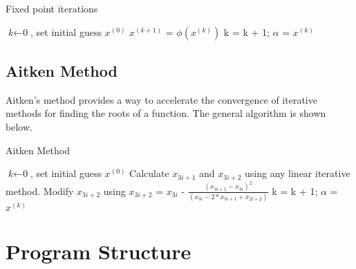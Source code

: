 \documentclass[11pt, a4paper]{article}
\begin{document}
\begin{algorithm}
  \caption{Fixed point iterations}\label{fixedpoint}
  \begin{algorithmic}[1]
    \State  $\textit{k} \gets \text{0}$, set initial guess $x^{(0)}$  
    \State $x^{(k+1)}$ = $\phi(x^{(k)})$
    \State k = k + 1;
    \EndWhile
    \Return $\alpha$ = $x^{(k)}$
  \end{algorithmic}
\end{algorithm}

\subsection{Aitken Method}
Aitken’s method provides a way to accelerate the convergence of iterative methods for finding the roots of a function.  The general algorithm is shown below.

\begin{algorithm}
  \caption{Aitken Method}\label{fixedpoint}
  \begin{algorithmic}[1]
    \State  $\textit{k} \gets \text{0}$, set initial guess $x^{(0)}$  
    \State Calculate $x_{3i+1}$ and $x_{3i+2}$ using any linear iterative method.
    \State Modify $x_{3i+2}$ using $x_{3i+2}$ = $x_{3i}$ - $\frac{(x_{3i+1}-x_{3i})^{2}}{(x_{3i}-2*x_{3i+1}+x_{2i+2})}$
    \State k = k + 1;
    \EndWhile
    \Return $\alpha$ = $x^{(k)}$
  \end{algorithmic}
\end{algorithm}

\section{Program Structure}
\end{document}
